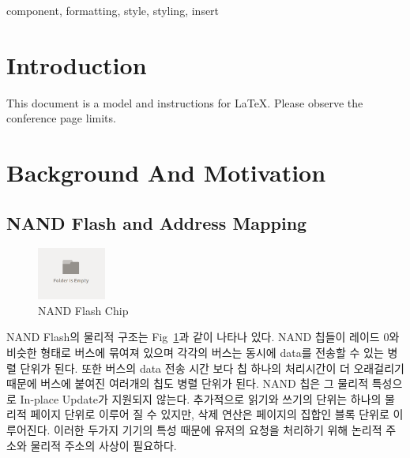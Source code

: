\documentclass[conference]{IEEEtran}
\begin{document}
\begin{IEEEkeywords}
component, formatting, style, styling, insert
\end{IEEEkeywords}

\section{Introduction}
This document is a model and instructions for \LaTeX.
Please observe the conference page limits. 

\section{Background And Motivation}
\subsection{NAND Flash and Address Mapping}
\begin{figure}[h]
	\centering
	\includegraphics[width=0.2\textwidth]{image/bg.png}
	\caption{NAND Flash Chip}
	\label{fig:chips}
\end{figure}
NAND Flash의 물리적 구조는 Fig~\ref{fig:chips}과 같이 나타나 있다. NAND 칩들이 레이드 0와 비슷한 형태로 버스에 묶여져 있으며 각각의 버스는 동시에 data를 전송할 수 있는 병렬 단위가 된다. 또한 버스의 data 전송 시간 보다 칩 하나의 처리시간이 더 오래걸리기 때문에 버스에 붙여진 여러개의 칩도 병렬 단위가 된다. NAND 칩은 그 물리적 특성으로 In-place Update가 지원되지 않는다. 추가적으로 읽기와 쓰기의 단위는 하나의 물리적 페이지 단위로 이루어 질 수 있지만, 삭제 연산은 페이지의 집합인 블록 단위로 이루어진다. 이러한 두가지 기기의 특성 때문에 유저의 요청을 처리하기 위해 논리적 주소와 물리적 주소의 사상이 필요하다. \par
\end{document}
